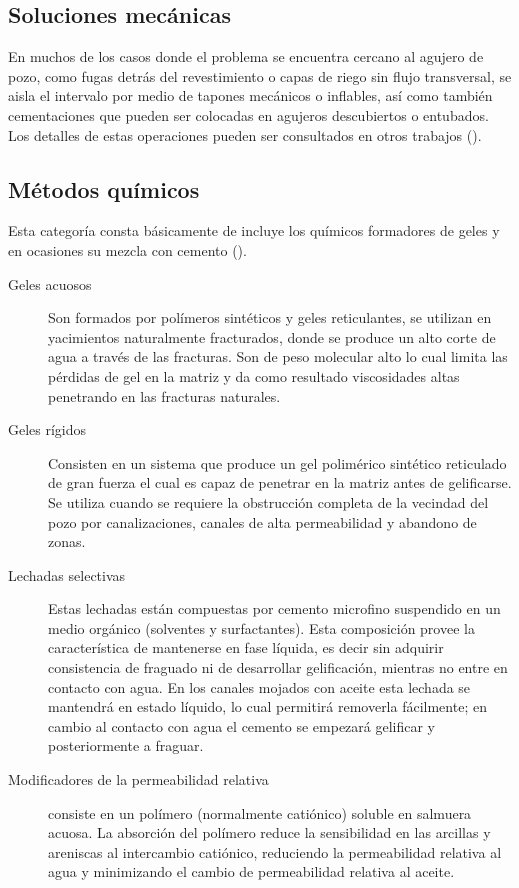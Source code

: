 \subsection{Soluciones mecánicas}
En muchos de los casos donde el problema se encuentra cercano al agujero de pozo, como fugas detrás del revestimiento o capas de riego sin flujo transversal, se aisla el intervalo por medio de tapones mecánicos o inflables, así como también cementaciones que pueden ser colocadas en agujeros descubiertos o entubados. Los detalles de estas operaciones pueden ser consultados en otros trabajos (\cite{SLB:2014}).

\subsection{Métodos químicos}
Esta categoría consta básicamente de incluye los químicos formadores de geles y en ocasiones su mezcla con cemento (\cite{SLB:2011}).

\begin{description}
    \item[Geles acuosos] Son formados por polímeros sintéticos y geles reticulantes, se utilizan en yacimientos naturalmente fracturados, donde se produce un alto corte de agua a través de las fracturas. Son de peso molecular alto lo cual limita las pérdidas de gel en la matriz y da como resultado viscosidades altas penetrando en las fracturas naturales.
    \item[Geles rígidos] Consisten en un sistema que produce un gel polimérico sintético reticulado de gran fuerza el cual es capaz de penetrar en la matriz antes de gelificarse. Se utiliza cuando se requiere la obstrucción completa de la vecindad del pozo por canalizaciones, canales de alta permeabilidad y abandono de zonas.
    \item[Lechadas selectivas] Estas lechadas están compuestas por cemento microfino suspendido en un medio orgánico (solventes y surfactantes). Esta composición provee la característica de mantenerse en fase líquida, es decir sin adquirir consistencia de fraguado ni de desarrollar gelificación, mientras no entre en contacto con agua. En los canales mojados con aceite esta lechada se mantendrá en estado líquido, lo cual permitirá removerla fácilmente; en cambio al contacto con agua el cemento se empezará gelificar y posteriormente a fraguar.
    \item[Modificadores de la permeabilidad relativa] consiste en un polímero (normalmente catiónico) soluble en salmuera acuosa. La absorción del polímero reduce la sensibilidad  en las arcillas y areniscas al intercambio catiónico, reduciendo la permeabilidad relativa al agua y minimizando el cambio de permeabilidad relativa al aceite.
\end{description}


